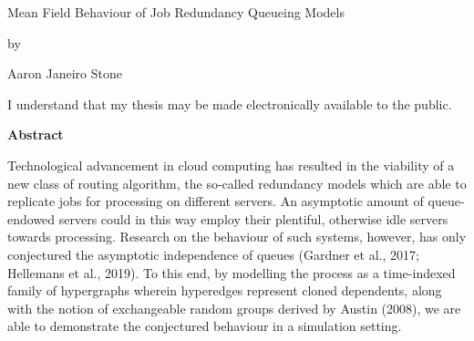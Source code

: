 \pagestyle{empty}


\begin{titlepage}
    \begin{center}
        \vspace*{1.0cm}

        \Huge Mean Field Behaviour of Job Redundancy Queueing Models

        \vspace*{1.0cm}

        \normalsize
        by \\

        \vspace*{1.0cm}

        \Large
        Aaron Janeiro Stone \\

        \vspace*{3.0cm}


    \end{center}
\end{titlepage}

\pagestyle{plain}
\setcounter{page}{2}

\cleardoublepage %




\bigskip

\noindent
I understand that my thesis may be made electronically available to the public.

\cleardoublepage


\begin{center}
    \textbf{Abstract}
\end{center}
Technological advancement in cloud computing has resulted in the viability of a new class of
routing algorithm, the so-called redundancy models which are able to replicate jobs for processing on different
servers. An asymptotic amount of queue-endowed servers could in this way employ their plentiful, otherwise
idle servers towards processing.
Research on the behaviour of such systems, however, has only conjectured
the asymptotic independence of queues (Gardner et al., 2017;
Hellemans et al., 2019).
To this end, by modelling the process as a time-indexed family of hypergraphs wherein
hyperedges represent cloned dependents,  along with the notion of exchangeable
random groups derived by Austin (2008), we are able to demonstrate the conjectured behaviour in a simulation setting.

